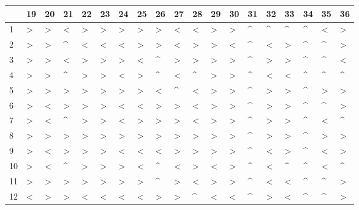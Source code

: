 \begin{tabular}{lllllllllllllllllll}
\toprule
{} & 19 & 20 & 21 & 22 & 23 & 24 & 25 & 26 & 27 & 28 & 29 & 30 & 31 & 32 & 33 & 34 & 35 & 36 \\
\midrule
1   &  > &  > &  < &  > &  > &  > &  > &  > &  < &  < &  > &  > &  \textasciicircum  &  \textasciicircum  &  \textasciicircum  &  \textasciicircum  &  < &  > \\
2   &  > &  > &  \textasciicircum  &  < &  < &  < &  > &  > &  < &  > &  > &  < &  \textasciicircum  &  < &  > &  \textasciicircum  &  \textasciicircum  &  > \\
3   &  > &  > &  < &  > &  > &  > &  < &  \textasciicircum  &  > &  > &  > &  > &  \textasciicircum  &  > &  > &  \textasciicircum  &  \textasciicircum  &  < \\
4   &  > &  > &  \textasciicircum  &  > &  > &  < &  > &  \textasciicircum  &  < &  \textasciicircum  &  > &  > &  \textasciicircum  &  < &  < &  \textasciicircum  &  \textasciicircum  &  \textasciicircum  \\
5   &  > &  > &  > &  > &  > &  > &  > &  < &  \textasciicircum  &  < &  > &  > &  \textasciicircum  &  > &  > &  \textasciicircum  &  > &  > \\
6   &  > &  < &  > &  > &  > &  < &  < &  > &  > &  < &  > &  > &  \textasciicircum  &  > &  > &  \textasciicircum  &  \textasciicircum  &  > \\
7   &  > &  < &  \textasciicircum  &  > &  > &  < &  > &  > &  > &  < &  > &  > &  \textasciicircum  &  > &  > &  \textasciicircum  &  < &  \textasciicircum  \\
8   &  > &  > &  > &  > &  > &  > &  > &  > &  > &  > &  > &  > &  \textasciicircum  &  > &  > &  \textasciicircum  &  > &  > \\
9   &  > &  < &  > &  > &  > &  < &  < &  < &  > &  > &  > &  > &  \textasciicircum  &  < &  > &  \textasciicircum  &  < &  > \\
10  &  > &  < &  \textasciicircum  &  > &  > &  > &  < &  \textasciicircum  &  < &  > &  < &  > &  \textasciicircum  &  < &  \textasciicircum  &  \textasciicircum  &  < &  \textasciicircum  \\
11  &  > &  > &  > &  > &  > &  > &  > &  \textasciicircum  &  > &  < &  > &  > &  \textasciicircum  &  < &  < &  \textasciicircum  &  \textasciicircum  &  > \\
12  &  < &  > &  > &  < &  < &  < &  < &  > &  > &  \textasciicircum  &  < &  < &  \textasciicircum  &  > &  < &  \textasciicircum  &  \textasciicircum  &  > \\

\end{tabular}
